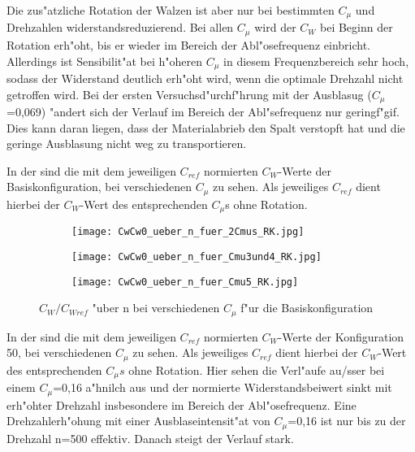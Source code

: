 Die zus"atzliche Rotation der Walzen ist aber nur bei bestimmten $C_{\mu}$ und Drehzahlen widerstandsreduzierend. Bei allen $C_{\mu}$ wird der $C_{W}$ bei Beginn der Rotation erh"oht, bis er wieder im Bereich der Abl"osefrequenz einbricht. Allerdings ist Sensibilit"at bei h"oheren $C_{\mu}$ in diesem Frequenzbereich sehr hoch, sodass der Widerstand deutlich erh"oht wird, wenn die optimale Drehzahl nicht getroffen wird. 
Bei der ersten Versuchsd"urchf"hrung mit der Ausblasug ($C_{\mu}$=0,069) "andert sich der Verlauf im Bereich der Abl"sefrequenz nur geringf"gif. Dies kann daran liegen, dass der Materialabrieb den Spalt verstopft hat und die geringe Ausblasung nicht weg zu transportieren.


In der  sind die mit dem jeweiligen $C_{ref}$ normierten $C_{W}$-Werte der Basiskonfiguration, bei verschiedenen $C_{\mu}$ zu sehen.
Als jeweiliges $C_{ref}$ dient hierbei der $C_{W}$-Wert des entsprechenden $C_{\mu}$s ohne Rotation.


\begin{figure}[h]
	\centering
	\begin{subfigure}[c]{0.45\textwidth}		
		\texttt{[image: CwCw0\_ueber\_n\_fuer\_2Cmus\_RK.jpg]}
	\end{subfigure}
	\begin{subfigure}[c]{0.45\textwidth}
		\texttt{[image: CwCw0\_ueber\_n\_fuer\_Cmu3und4\_RK.jpg]}
	\end{subfigure}
	\begin{subfigure}[c]{0.45\textwidth}
		\texttt{[image: CwCw0\_ueber\_n\_fuer\_Cmu5\_RK.jpg]}
	\end{subfigure}
	\caption{$C_{W}/C_{Wref}$ "uber n bei verschiedenen $C_{\mu}$ f"ur die Basiskonfiguration}
	\label{fig:CwCwref/n Cmu RK}
\end{figure}

In der  sind die mit dem jeweiligen $C_{ref}$ normierten $C_{W}$-Werte der Konfiguration 50, bei verschiedenen $C_{\mu}$ zu sehen.
Als jeweiliges $C_{ref}$ dient hierbei der $C_{W}$-Wert des entsprechenden $C_{\mu}s$ ohne Rotation.
Hier sehen die Verl"aufe au/ss{}er bei einem $C_{\mu}$=0,16 a"hnilch aus und der normierte Widerstandsbeiwert sinkt mit erh"ohter Drehzahl insbesondere im Bereich der Abl"osefrequenz. 
Eine Drehzahlerh"ohung mit einer Ausblaseintensit"at von $C_{\mu}$=0,16 ist nur bis zu der Drehzahl n=500 effektiv. Danach steigt der Verlauf stark.

